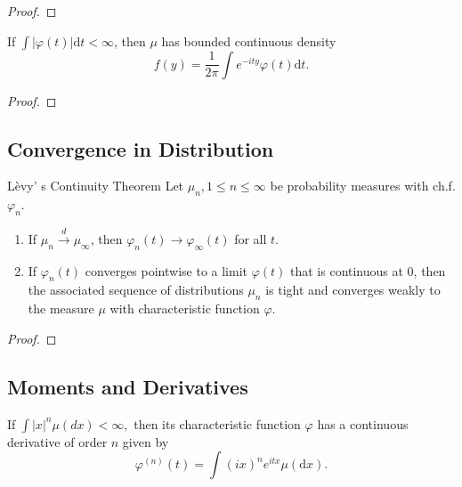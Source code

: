 \begin{proof}

\end{proof}

\begin{theorem}{}{}
    If $\int|\varphi(t)|\mathrm{d}t<\infty$, then $\mu$ has bounded continuous density
    \begin{equation}
        f(y)=\frac{1}{2\pi}\int e^{-ity}\varphi(t) \mathrm{d}t.
    \end{equation}
\end{theorem}

\begin{proof}

\end{proof}

\subsection{Convergence in Distribution}

\begin{theorem}{L\`evy' s Continuity Theorem}{}
    Let $\mu_{n},1\leq n\leq\infty$ be probability measures with ch.f. $\varphi_{n}$.
    \begin{enumerate}
        \item If $\mu_{n}\stackrel{d}{\rightarrow}\mu_{\infty}$, then $\varphi_{n}(t)\rightarrow\varphi_{\infty}(t)$ for all $t$.
        \item If $\varphi_{n}(t)$ converges pointwise to a limit $\varphi(t)$ that is continuous at $0$, then the associated sequence of distributions $\mu_{n}$ is tight and converges weakly to the measure $\mu$ with characteristic function $\varphi$.
    \end{enumerate}
\end{theorem}

\begin{proof}

\end{proof}

\subsection{Moments and Derivatives}

\begin{theorem}{}{}
    If $\int|x|^{n}\mu(d x)<\infty,$ then its characteristic function $\varphi$ has a continuous derivative of order $n$ given by
    \begin{equation}
        \varphi^{(n)}(t)=\int(i x)^{n}e^{itx}\mu(\mathrm{d}x).
    \end{equation}
\end{theorem}

